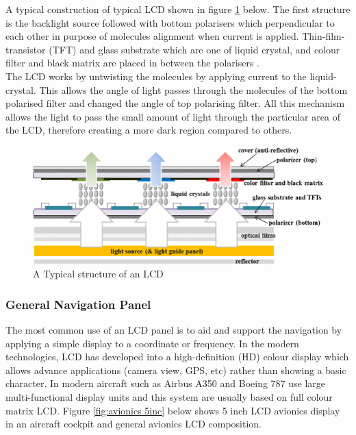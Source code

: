\noindent A typical construction of typical LCD shown in figure \ref{fig:LCD structure} below. The first structure is the backlight source followed with bottom polarisers which perpendicular to each other in purpose of molecules alignment when current is applied. Thin-film-transistor (TFT) and glass substrate which are one of liquid crystal, and colour filter and black matrix are placed in between the polarisers \cite{AnonymousLCDApplications}. \\ 

\noindent The LCD works by untwisting the molecules by applying current to the liquid-crystal. This allows the angle of light passes through the molecules of the bottom polarised filter and changed the angle of top polarising filter. All this mechanism allows the light to pass the small amount of light through the particular area of the LCD, therefore creating a more dark region compared to others.

\begin{figure}[!ht]
    \centering
    \includegraphics[scale=0.4]{Figures/LCD_Typical structure.png}
    \caption{A Typical structure of an LCD \cite{Park2013EfficiencyPrograms}}
    \label{fig:LCD structure}
\end{figure}

\subsubsection{General Navigation Panel}
The most common use of an LCD panel is to aid and support the navigation by applying a simple display to a coordinate or frequency. In the modern technologies, LCD has developed into a  high-definition (HD) colour display which allows advance applications (camera view, GPS, etc)  rather than showing a basic character. In modern aircraft such as Airbus A350 and Boeing 787 use large multi-functional display units \cite{AnonymousTouchAirbus} and this system are usually based on full colour matrix LCD. Figure \ref{fig:avionics 5inc} below shows 5 inch LCD avionics display in an aircraft cockpit and general avionics LCD composition.

